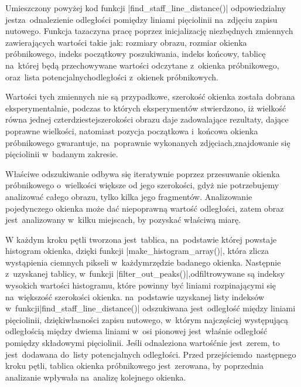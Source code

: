 Umieszczony powyżej kod funkcji \pyth|find_staff_line_distance()| odpowiedzialny jest\linebreak za~odnalezienie odległości pomiędzy liniami pięciolinii na~zdjęciu zapisu nutowego. Funkcja ta\linebreak zaczyna pracę poprzez inicjalizację niezbędnych zmiennych zawierających wartości takie jak: rozmiary obrazu, rozmiar okienka próbnikowego, indeks początkowy poszukiwania, indeks końcowy, tablicę na~której będą przechowywane wartości odczytane z~okienka próbnikowego, oraz~lista potencjalnych\linebreak odległości z~okienek próbnikowych.

Wartości tych zmiennych nie są przypadkowe, szerokość okienka została dobrana eksperymentalnie, podczas to których eksperymentów stwierdzono, iż wielkość równa jednej czterdziestej\linebreak szerokości obrazu daje zadowalające rezultaty, dające poprawne wielkości, natomiast pozycja początkowa i~końcowa okienka próbnikowego gwarantuje, na~poprawnie wykonanych zdjęciach,\linebreak znajdowanie się pięciolinii w~badanym zakresie.

Właściwe odszukiwanie odbywa się iteratywnie poprzez przesuwanie okienka próbnikowego o~wielkości większe od jego szerokości, gdyż nie potrzebujemy analizować całego obrazu, tylko kilka jego fragmentów. Analizowanie pojedynczego okienka może dać niepoprawną wartość odległości, zatem obraz jest~analizowany w~kilku miejscach, by pozyskać właściwą miarę.

W każdym kroku pętli tworzona jest~tablica, na~podstawie której powstaje histogram okienka, dzięki funkcji \pyth|make_histogram_array()|, która zlicza wystąpienia ciemnych pikseli w~każdym\linebreak rzędzie badanego okienka. Następnie z~uzyskanej tablicy, w~funkcji \pyth|filter_out_peaks()|,\linebreak odfiltrowywane są indeksy wysokich wartości histogramu, które powinny być liniami rozpinającymi się na~większość szerokości okienka. na~podstawie uzyskanej listy indeksów w~funkcji\linebreak \pyth|find_staff_line_distance()| odszukiwana jest~odległość między liniami pięciolinii, dzięki\linebreak własności zapisu nutowego, w~którym najczęściej występującą odległością między dwiema liniami w~osi pionowej jest~właśnie odległość pomiędzy składowymi pięciolinii. Jeśli odnaleziona wartość\linebreak nie jest~zerem, to jest~dodawana do~listy potencjalnych odległości. Przed przejściem\linebreak do~następnego kroku pętli, tablica okienka próbnikowego jest~zerowana, by poprzednia analiza\linebreak nie wpływała na~analizę kolejnego okienka.

